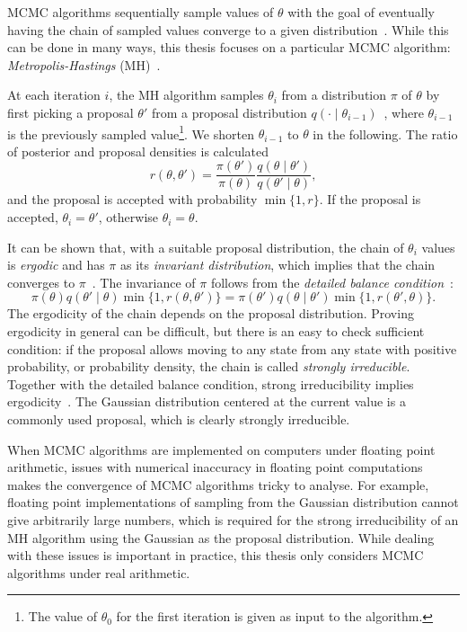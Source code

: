 \documentclass[english,twoside,openright]{HYgraduMLDS}
\begin{document}
MCMC algorithms sequentially sample values of \(\theta\)
with the goal of eventually having the chain of sampled values converge to 
a given distribution~\cite{Robert04}. While this can be done in many ways, this thesis
focuses on a particular MCMC algorithm:
\emph{Metropolis-Hastings} (MH)~\cite{MRR53, Has70}.

At each iteration \(i\), the MH algorithm samples \(\theta_i\)
from a distribution \(\pi\) of \(\theta\)
by first picking a proposal \(\theta'\) from a proposal 
distribution \(q(\cdot \mid \theta_{i-1})\)~\cite{MRR53}, where \(\theta_{i-1}\) is the
previously sampled value\footnote{
    The value of \(\theta_0\) for the first iteration is given as input to the 
    algorithm.
}. We shorten \(\theta_{i-1}\) to \(\theta\) in the following. 
The ratio of posterior and proposal densities is calculated
\[
    r(\theta, \theta') = \frac{\pi(\theta')}{\pi(\theta)}
    \frac{q(\theta\mid \theta')}{q(\theta'\mid \theta)},
\]
and the proposal is accepted with probability \(\min\{1, r\}\). 
If the proposal is accepted, 
\(\theta_i = \theta'\), otherwise \(\theta_i = \theta\).

It can be shown that, with a suitable proposal distribution, the chain of
\(\theta_i\) values is \emph{ergodic} and has \(\pi\) as its \emph{invariant
distribution}, which implies that the chain converges to \(\pi\)~\cite{Has70}.
The invariance of \(\pi\) follows from the \emph{detailed balance condition}~\cite{Robert04}:
\[
  \pi(\theta)q(\theta'\mid \theta)\min\{1, r(\theta, \theta')\}
  = \pi(\theta')q(\theta\mid \theta')\min\{1, r(\theta', \theta)\}.
\]
The ergodicity of the chain depends on the proposal distribution. Proving
ergodicity in general can be difficult, but there is an easy to check
sufficient condition: if the proposal allows moving to any state from any
state with positive probability, or probability density, the chain is called
\emph{strongly irreducible}. Together with the detailed balance condition,
strong irreducibility implies ergodicity~\cite{Robert04}. The Gaussian
distribution centered
at the current value is a commonly used proposal, which is clearly
strongly irreducible.

When MCMC algorithms are implemented on computers under floating point
arithmetic, issues with numerical inaccuracy in floating point computations
makes the convergence of MCMC algorithms tricky to analyse. For example,
floating point implementations of sampling from the Gaussian distribution cannot give
arbitrarily large numbers, which is required for the strong irreducibility
of an MH algorithm using the Gaussian as the proposal distribution.
While dealing with these issues is important in practice, this thesis only
considers MCMC algorithms under real arithmetic.
\end{document}
